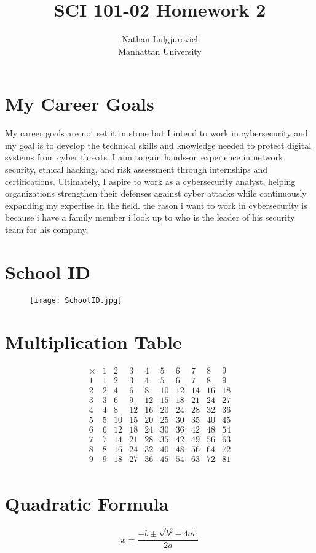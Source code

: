 \documentclass[11pt]{article}
\begin{document}
\title{SCI 101-02 Homework 2}
\author{Nathan Lulgjurovicl\\
Manhattan University}
\maketitle

\section {My Career Goals}

My career goals are not set it in stone but I intend to work in cybersecurity and my goal is to develop the technical skills and knowledge needed to protect digital systems from cyber threats. I aim to gain hands-on experience in network security, ethical hacking, and risk assessment through internships and certifications. Ultimately, I aspire to work as a cybersecurity analyst, helping organizations strengthen their defenses against cyber attacks while continuously expanding my expertise in the field. the rason i want to work in cybersecurity is because i have a family member i look up to who is the leader of his security team for his company.

\section {School ID}

\begin{figure}[!h]
\centering
\texttt{[image: SchoolID.jpg]}
\end{figure}

\section{Multiplication Table}

\[
\begin{array}{c|ccccccccc}
\times & 1 & 2 & 3 & 4 & 5 & 6 & 7 & 8 & 9 \\
\hline
1 & 1 & 2 & 3 & 4 & 5 & 6 & 7 & 8 & 9 \\
2 & 2 & 4 & 6 & 8 & 10 & 12 & 14 & 16 & 18 \\
3 & 3 & 6 & 9 & 12 & 15 & 18 & 21 & 24 & 27 \\
4 & 4 & 8 & 12 & 16 & 20 & 24 & 28 & 32 & 36 \\
5 & 5 & 10 & 15 & 20 & 25 & 30 & 35 & 40 & 45 \\
6 & 6 & 12 & 18 & 24 & 30 & 36 & 42 & 48 & 54 \\
7 & 7 & 14 & 21 & 28 & 35 & 42 & 49 & 56 & 63 \\
8 & 8 & 16 & 24 & 32 & 40 & 48 & 56 & 64 & 72 \\
9 & 9 & 18 & 27 & 36 & 45 & 54 & 63 & 72 & 81 \\
\end{array}
\]

\section{Quadratic Formula}

\[
x = \frac{-b \pm \sqrt{b^2 - 4ac}}{2a}
\]
\end{document}
